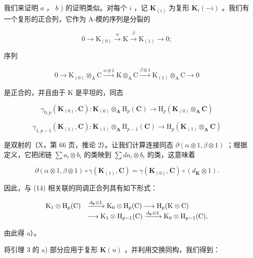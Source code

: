 我们来证明 \(a\) ， \(b\) ) 的证明类似。对每个 \(i\) ，记 \(\mathbf{K}_{(i)}\) 为复形 \(\mathbf{K}_i(-i)\) 。我们有一个复形的正合列，它作为 A-模的序列是分裂的

\[
0 \rightarrow \mathrm{K} _ {(0)} \xrightarrow {\alpha} \mathrm{K} \xrightarrow {\beta} \mathrm{K} _ {(1)} \rightarrow 0;
\]

序列

\[
0 \longrightarrow \mathrm{K} _ {(0)} \otimes_ {\mathrm{A}} \mathrm{C} \xrightarrow {\alpha \otimes 1} \mathrm{K} \otimes_ {\mathrm{A}} \mathrm{C} \xrightarrow {\beta \otimes 1} \mathrm{K} _ {(1)} \otimes_ {\mathrm{A}} \mathrm{C} \longrightarrow 0\tag{14}
\]

是正合的，并且由于 K 是平坦的，同态

\[
\gamma_ {0, p} (\mathbf {K} _ {(0)}, \mathbf {C}): \mathbf {K} _ {(0)} \otimes_ {\mathbf {A}} \mathrm{H} _ {p} (\mathbf {C}) \rightarrow \mathrm{H} _ {p} (\mathbf {K} _ {(0)} \otimes_ {\mathbf {A}} \mathbf {C})
\]

\[
\gamma_ {1, p - 1} (\mathbf {K} _ {(1)}, \mathbf {C}): \mathbf {K} _ {(1)} \otimes_ {\mathbf {A}} \mathrm{H} _ {p - 1} (\mathbf {C}) \rightarrow \mathrm{H} _ {p} (\mathbf {K} _ {(1)} \otimes_ {\mathbf {A}} \mathbf {C})
\]

是双射的（X，第 66 页，推论 2）。让我们计算连接同态 \(\partial (\alpha \otimes 1, \beta \otimes 1)\) ；根据定义，它把闭链 \(\sum a_i \otimes b_i\) 的类映到 \(\sum da_i \otimes b_i\) 的类，这意味着

\[
\partial (\alpha \otimes 1, \beta \otimes 1) \circ \gamma (\mathbf {K} _ {(1)}, \mathbf {C}) = \gamma (\mathbf {K} _ {(0)}, \mathbf {C}) \circ (d _ {\mathbf {K}} \otimes 1).
\]

因此，与 (14) 相关联的同调正合列具有如下形式：

\[
\begin{array}{r l} \mathrm{K} _ {1} \otimes \mathrm{H} _ {p} (\mathrm{C}) & \xrightarrow {d _ {\mathbf {k}} \otimes 1} \mathrm{K} _ {0} \otimes \mathrm{H} _ {p} (\mathrm{C}) \longrightarrow \mathrm{H} _ {p} (\mathrm{K} \otimes \mathrm{C}) \\ & \longrightarrow \mathrm{K} _ {1} \otimes \mathrm{H} _ {p - 1} (\mathrm{C}) \xrightarrow {d _ {\mathbf {k}} \otimes 1} \mathrm{K} _ {0} \otimes \mathrm{H} _ {p - 1} (\mathrm{C}), \end{array}
\]

由此得 a）。

将引理 3 的 a) 部分应用于复形 \(\mathbf{K}(u)\) ，并利用交换同构，我们得到：

